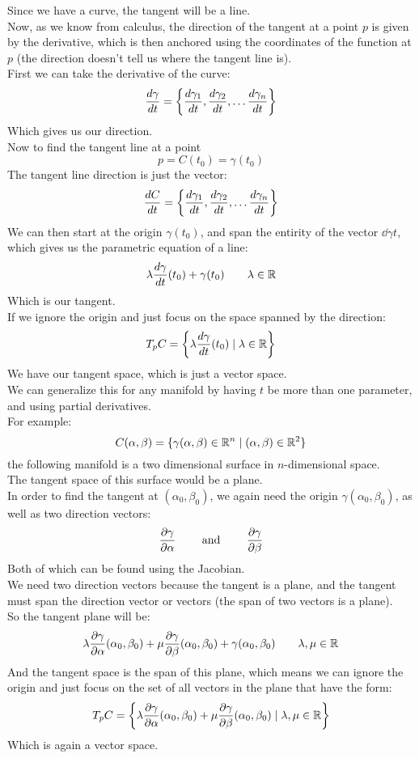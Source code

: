 \documentclass[12pt]{article}
\begin{document}
Since we have a curve, the tangent will be a line. \\
Now, as we know from calculus,
the direction of the tangent at a point $p$
is given by the derivative,
which is then anchored using the coordinates
of the function at $p$
(the direction doesn't tell us where the tangent
line is). \\

First we can take the derivative of the curve:
\[ \dfrac{d\gamma}{dt} = \left\{ \dfrac{d\gamma_1}{dt},
\dfrac{d\gamma_2}{dt}, \dots
\dfrac{d\gamma_n}{dt}  \right\} \]
Which gives us our direction. \\

Now to find the tangent line at a point
\[ p = C(t_0) = \gamma(t_0) \]
The tangent line direction is just the vector:
\[ \dfrac{dC}{dt} = \left\{ \dfrac{d\gamma_1}{dt},
\dfrac{d\gamma_2}{dt}, \dots
\dfrac{d\gamma_n}{dt}  \right\} \]
We can then start at the origin $\gamma(t_0)$,
and span the entirity of the vector $\dd{\gamma}{t}$,
which gives us the parametric equation of a line:
\[ \lambda \dfrac{d\gamma}{dt}(t_0) +
\gamma(t_0) \qquad \lambda \in \mathbb{R} \]
Which is our tangent. \\

If we ignore the origin and just focus
on the space spanned by the direction:
\[ T_pC = \left\{  \lambda \dfrac{d\gamma}{dt}(t_0)
\mid \lambda \in \mathbb{R}  \right\} \]
We have our tangent space,
which is just a vector space. \\

We can generalize this for any manifold
by having $t$ be more than one parameter,
and using partial derivatives. \\

For example:
\[ C(\alpha, \beta) =
\{\gamma(\alpha, \beta) \in \mathbb{R}^n 
\mid (\alpha, \beta) \in \mathbb{R}^2 \} \]
the following manifold is a two dimensional
surface in $n$-dimensional space. \\
The tangent space of this surface would be a
plane. \\
In order to find the tangent at 
$(\alpha_0, \beta_0)$, we again need the origin
$\gamma(\alpha_0, \beta_0)$,
as well as two direction vectors:
\[ \dfrac{\partial \gamma}{\partial \alpha}
\qquad \text{ and } \qquad \dfrac{\partial \gamma}{\partial \beta} \]
Both of which can be found using the Jacobian. \\
We need two direction vectors because the
tangent is a plane, and the tangent
must span the direction vector or vectors
(the span of two vectors is a plane). \\
So the tangent plane will be:
\[
\lambda \dfrac{\partial \gamma}{\partial \alpha}(\alpha_0, \beta_0) +
\mu \dfrac{\partial \gamma}{\partial \beta}(\alpha_0, \beta_0) +
\gamma(\alpha_0, \beta_0) \qquad
\lambda, \mu \in \mathbb{R} \]
And the tangent space is the
span of this plane, which means we
can ignore the origin and just focus
on the set of all vectors in the plane
that have the form:
\[ T_pC = \left\{  
\lambda \dfrac{\partial \gamma}{\partial \alpha}(\alpha_0, \beta_0)
+ \mu \dfrac{\partial \gamma}{\partial \beta}(\alpha_0, \beta_0) 
\mid \lambda, \mu \in \mathbb{R}  \right\} \]
Which is again a vector space. \\
\end{document}
